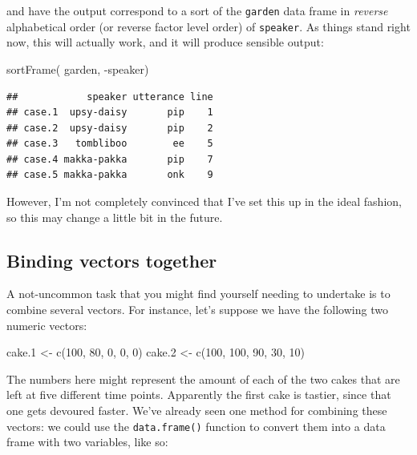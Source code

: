 \documentclass[
]{book}
\newenvironment{Shaded}{\begin{snugshade}}{\end{snugshade}}
\newcommand{\DecValTok}[1]{\textcolor[rgb]{0.00,0.00,0.81}{#1}}
\newcommand{\FloatTok}[1]{\textcolor[rgb]{0.00,0.00,0.81}{#1}}
\newcommand{\FunctionTok}[1]{\textcolor[rgb]{0.00,0.00,0.00}{#1}}
\newcommand{\NormalTok}[1]{#1}
\newcommand{\OtherTok}[1]{\textcolor[rgb]{0.56,0.35,0.01}{#1}}
\newcommand{\SpecialCharTok}[1]{\textcolor[rgb]{0.00,0.00,0.00}{#1}}
\begin{document}
and have the output correspond to a sort of the \texttt{garden} data frame in \emph{reverse} alphabetical order (or reverse factor level order) of \texttt{speaker}. As things stand right now, this will actually work, and it will produce sensible output:

\begin{Shaded}
\begin{Highlighting}[]
\FunctionTok{sortFrame}\NormalTok{( garden, }\SpecialCharTok{{-}}\NormalTok{speaker)}
\end{Highlighting}
\end{Shaded}

\begin{verbatim}
##            speaker utterance line
## case.1  upsy-daisy       pip    1
## case.2  upsy-daisy       pip    2
## case.3   tombliboo        ee    5
## case.4 makka-pakka       pip    7
## case.5 makka-pakka       onk    9
\end{verbatim}

However, I'm not completely convinced that I've set this up in the ideal fashion, so this may change a little bit in the future.

\hypertarget{binding-vectors-together}{%
\subsection{Binding vectors together}\label{binding-vectors-together}}

A not-uncommon task that you might find yourself needing to undertake is to combine several vectors. For instance, let's suppose we have the following two numeric vectors:

\begin{Shaded}
\begin{Highlighting}[]
\NormalTok{cake}\FloatTok{.1} \OtherTok{\textless{}{-}} \FunctionTok{c}\NormalTok{(}\DecValTok{100}\NormalTok{, }\DecValTok{80}\NormalTok{, }\DecValTok{0}\NormalTok{, }\DecValTok{0}\NormalTok{, }\DecValTok{0}\NormalTok{)}
\NormalTok{cake}\FloatTok{.2} \OtherTok{\textless{}{-}} \FunctionTok{c}\NormalTok{(}\DecValTok{100}\NormalTok{, }\DecValTok{100}\NormalTok{, }\DecValTok{90}\NormalTok{, }\DecValTok{30}\NormalTok{, }\DecValTok{10}\NormalTok{)}
\end{Highlighting}
\end{Shaded}

The numbers here might represent the amount of each of the two cakes that are left at five different time points. Apparently the first cake is tastier, since that one gets devoured faster. We've already seen one method for combining these vectors: we could use the \texttt{data.frame()} function to convert them into a data frame with two variables, like so:
\end{document}
